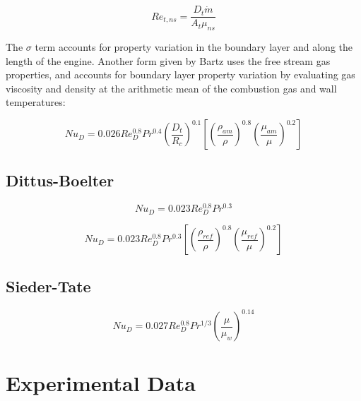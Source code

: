 \documentclass[11pt]{article}
\begin{document}
\begin{equation}
  Re_{t, ns} = \frac{D_t \dot{m}}{A_t \mu_{ns}}
\end{equation}

The $\sigma$ term accounts for property variation in the boundary layer and along the length of the engine. Another form given by Bartz uses the free stream gas properties, and accounts for boundary layer property variation by evaluating gas viscosity and density at the arithmetic mean of the combustion gas and wall temperatures:

\begin{equation}
  Nu_{D} = 0.026 Re_{D}^{0.8} Pr^{0.4} \left( \frac{D_t}{R_c} \right)^{0.1} \left[ \left( \frac{\rho_{am}}{\rho} \right)^{0.8} \left(\frac{\mu_{am}}{\mu} \right)^{0.2}\right]
\end{equation}


\subsection{Dittus-Boelter}


\begin{equation}
  Nu_{D} = 0.023 Re_{D}^{0.8} Pr^{0.3}
\end{equation}

\begin{equation}
  Nu_{D} = 0.023 Re_{D}^{0.8} Pr^{0.3} \left[ \left( \frac{\rho_{ref}}{\rho} \right)^{0.8} \left(\frac{\mu_{ref}}{\mu} \right)^{0.2}\right]
\end{equation}

\subsection{Sieder-Tate}

\begin{equation}
  Nu_{D} = 0.027 Re_{D}^{0.8} Pr^{1/3} \left( \frac{\mu}{\mu_w} \right)^{0.14}
\end{equation}


\section{Experimental Data}
\end{document}
